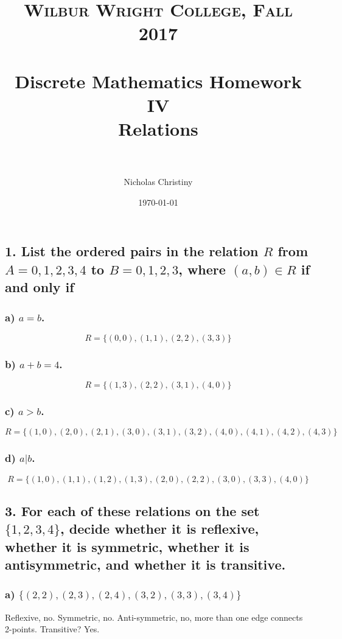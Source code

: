\documentclass[11pt, oneside]{article} %
\title{
\normalfont \normalsize
\textsc{Wilbur Wright College, Fall 2017} \\ [25pt] %
\horrule{0.5pt} \\[0.4cm] %
\huge Discrete Mathematics Homework IV\\ %
\huge Relations \\
\horrule{2pt} \\[0.5cm] %
}
\author{Nicholas Christiny} %
\date{\normalsize\today} %
\numberwithin{equation}{section} %
\numberwithin{figure}{section} %
\numberwithin{table}{section} %
\begin{document}
\maketitle %


\section{}
\subsection{1. List the ordered pairs in the relation $R$ from $A = {0,1,2,3,4}$ to $B = {0,1,2,3}$, where $(a,b) ∈ R$ if and only if}
\subsubsection{a) $a=b$.}
$$R = \{(0,0),(1,1),(2,2),(3,3)\}$$
\subsubsection{b) $a+b=4$.}
$$R=\{(1,3),(2,2),(3,1),(4,0)\}$$
\subsubsection{c) $a>b$.}
$$R=\{(1,0),(2,0),(2,1),(3,0),(3,1),(3,2),(4,0),(4,1),(4,2),(4,3)\}$$
\subsubsection{d) $a|b$.}
$$ R=\{(1,0),(1,1),(1,2),(1,3),(2,0),(2,2),(3,0),(3,3),(4,0)\}  $$

\subsection{3. For each of these relations on the set $\{1, 2, 3, 4\}$, decide whether it is reflexive, whether it is symmetric, whether it is antisymmetric, and whether it is transitive.}
\subsubsection{a) $\{(2,2),(2,3),(2,4),(3,2),(3,3),(3,4)\}$}
Reflexive, no. Symmetric, no. Anti-symmetric, no, more than one edge connects 2-points. Transitive? Yes.
\end{document}
